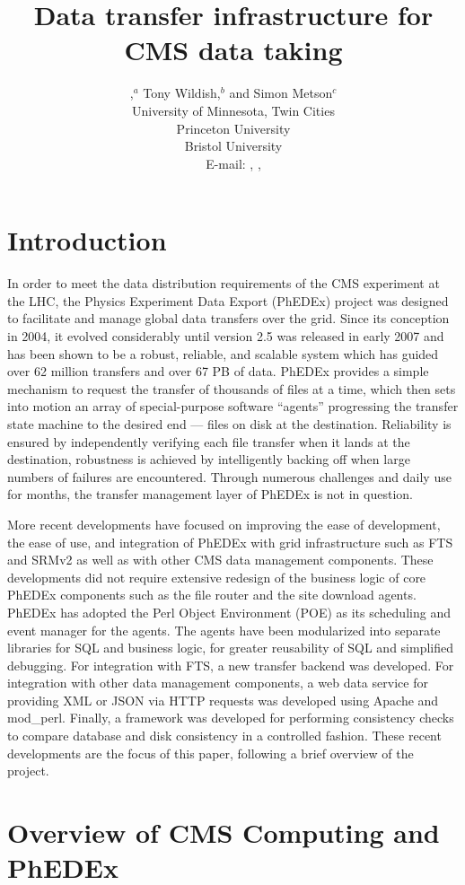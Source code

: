 \documentclass{PoS}
\title{Data transfer infrastructure for CMS data taking}
\author{
  \speaker{Ricky Egeland},$^a$ Tony Wildish,$^{b}$ and Simon Metson$^{c}$\\ 
  \llap{$^a$}University of Minnesota, Twin Cities\\ 
  \llap{$^b$}Princeton University\\ 
  \llap{$^c$}Bristol University\\ 
  E-mail: \email{Ricky.Egeland@cern.ch}, \email{Tony.Wildish@cern.ch}, \email{Simon.Metson@cern.ch}
}
\begin{document}
\section{Introduction}

In order to meet the data distribution requirements
\cite{cms-comp-proposal, cms-comp-tdr, cms-comp-model} of the CMS
\cite{cms-proposal} experiment at the LHC, the Physics Experiment Data
Export (PhEDEx) \cite{phedex-chep06, phedex-chep07} project was
designed to facilitate and manage global data transfers over the grid.
Since its conception in 2004, it evolved considerably until version
2.5 was released in early 2007 and has been shown to be a robust,
reliable, and scalable system which has guided over 62 million
transfers and over 67 PB of data.  PhEDEx provides a simple mechanism
to request the transfer of thousands of files at a time, which then
sets into motion an array of special-purpose software ``agents''
progressing the transfer state machine to the desired end --- files on
disk at the destination.  Reliability is ensured by independently
verifying each file transfer when it lands at the destination,
robustness is achieved by intelligently backing off when large numbers
of failures are encountered.  Through numerous challenges and daily
use for months, the transfer management layer of PhEDEx is not in
question.

More recent developments have focused on improving the ease of
development, the ease of use, and integration of PhEDEx with grid
infrastructure such as FTS and SRMv2 as well as with other CMS data
management components.  These developments did not require extensive
redesign of the business logic of core PhEDEx components such as the
file router and the site download agents.  PhEDEx has adopted the Perl
Object Environment (POE) as its scheduling and event manager for the
agents.  The agents have been modularized into separate libraries for
SQL and business logic, for greater reusability of SQL and simplified
debugging.  For integration with FTS, a new transfer backend was
developed.  For integration with other data management components, a
web data service for providing XML or JSON via HTTP requests was
developed using Apache and mod\_perl.  Finally, a framework was
developed for performing consistency checks to compare database and
disk consistency in a controlled fashion.  These recent developments
are the focus of this paper, following a brief overview of the
project.

\section{Overview of CMS Computing and PhEDEx}
\end{document}
